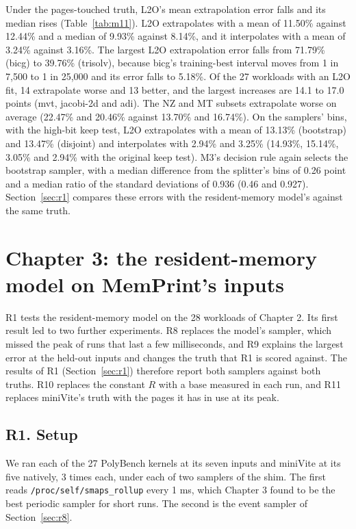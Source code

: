 \documentclass[11pt]{article}
\newcommand{\memprint}{MemPrint}
\begin{document}
Under the pages-touched truth, L2O's mean extrapolation error falls and its median rises (Table~\ref{tab:m11}).
L2O extrapolates with a mean of 11.50\% against 12.44\% and a median of 9.93\% against 8.14\%, and it interpolates
with a mean of 3.24\% against 3.16\%. The largest L2O extrapolation error falls from 71.79\% (bicg) to 39.76\%
(trisolv), because bicg's training-best interval moves from 1 in 7,500 to 1 in 25,000 and its error falls to 5.18\%.
Of the 27 workloads with an L2O fit, 14 extrapolate worse and 13 better, and the largest increases are 14.1 to 17.0
points (mvt, jacobi-2d and adi). The NZ and MT subsets extrapolate worse on average (22.47\% and 20.46\% against
13.70\% and 16.74\%). On the samplers' bins, with the high-bit keep test, L2O extrapolates with a mean of 13.13\%
(bootstrap) and 13.47\% (disjoint) and interpolates with 2.94\% and 3.25\% (14.93\%, 15.14\%, 3.05\% and 2.94\% with the
original keep test). M3's decision rule again selects the bootstrap sampler, with a median difference from the
splitter's bins of 0.26 point and a median ratio of the standard deviations of 0.936 (0.46 and 0.927). Section~\ref{sec:r1} compares these errors with the resident-memory model's against the same truth.

\section{Chapter 3: the resident-memory model on \memprint{}'s inputs}
\label{sec:ch3}

R1 tests the resident-memory model on the 28 workloads of Chapter 2. Its first result led to two further
experiments. R8 replaces the model's sampler, which missed the peak of runs that last a few milliseconds, and R9
explains the largest error at the held-out inputs and changes the truth that R1 is scored against. The
results of R1 (Section~\ref{sec:r1}) therefore report both samplers against both truths. R10 replaces the constant
$R$ with a base measured in each run, and R11 replaces miniVite's truth with the pages it has in use at its peak.

\subsection{R1. Setup}
\label{sec:r1setup}

We ran each of the 27 PolyBench kernels at its seven inputs and miniVite at its five natively, 3 times each, under
each of two samplers of the shim. The first reads \texttt{/proc/self/smaps\_rollup} every 1 ms, which Chapter 3
found to be the best periodic sampler for short runs. The second is the event sampler of Section~\ref{sec:r8}.
\end{document}
